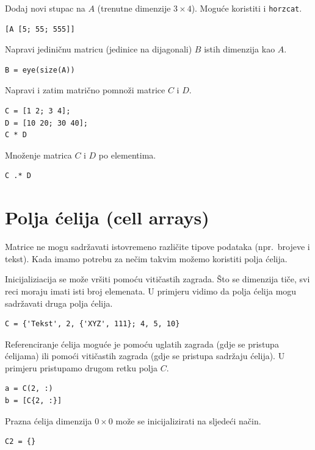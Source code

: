 \documentclass[a4paper, 10pt]{article}
\begin{document}
Dodaj novi stupac na $A$ (trenutne dimenzije $3 \times 4$). Moguće koristiti i \texttt{horzcat}.

\begin{lstlisting}
[A [5; 55; 555]]
\end{lstlisting}

Napravi jediničnu matricu (jedinice na dijagonali) $B$ istih dimenzija kao $A$.

\begin{lstlisting}
B = eye(size(A))
\end{lstlisting}

Napravi i zatim matrično pomnoži matrice $C$ i $D$.

\begin{lstlisting}
C = [1 2; 3 4];
D = [10 20; 30 40];
C * D
\end{lstlisting}

Množenje matrica $C$ i $D$ po elementima.

\begin{lstlisting}
C .* D
\end{lstlisting}

\section{Polja ćelija (cell arrays)}

Matrice ne mogu sadržavati istovremeno različite tipove podataka (npr.\ brojeve i tekst). Kada imamo potrebu za nečim takvim možemo koristiti polja ćelija.

Inicijaliziacija se može vršiti pomoću vitičastih zagrada. Što se dimenzija tiče, svi reci moraju imati isti broj elemenata. U primjeru vidimo da polja ćelija mogu sadržavati druga polja ćelija.

\begin{lstlisting}
C = {'Tekst', 2, {'XYZ', 111}; 4, 5, 10}
\end{lstlisting}

Referenciranje ćelija moguće je pomoću uglatih zagrada (gdje se pristupa ćelijama) ili pomoći vitičastih zagrada (gdje se pristupa sadržaju ćelija). U primjeru pristupamo drugom retku polja $C$. 

\begin{lstlisting}
a = C(2, :)
b = [C{2, :}]
\end{lstlisting}

Prazna ćelija dimenzija $0 \times 0$ može se inicijalizirati na sljedeći način.

\begin{lstlisting}
C2 = {}
\end{lstlisting}
\end{document}
